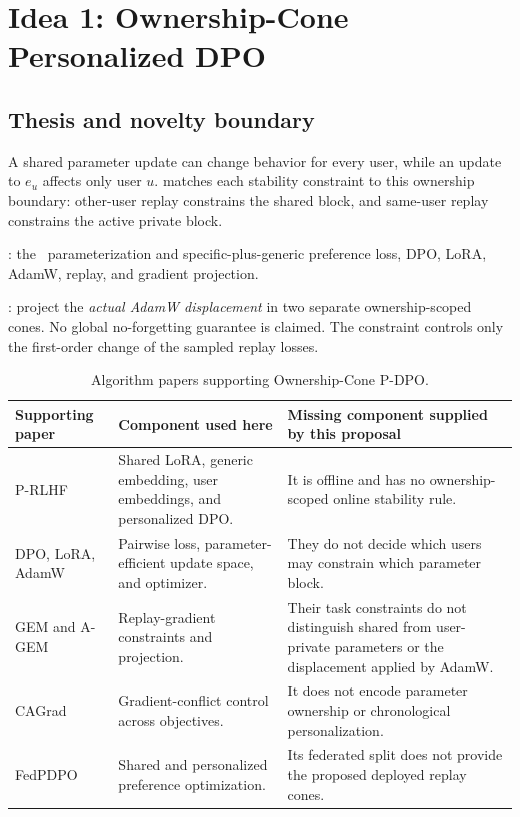 \section{Idea 1: Ownership-Cone Personalized DPO}
\label{sec:ownership-cone}

\subsection{Thesis and novelty boundary}

A shared parameter update can change behavior for every user, while an update
to $e_u$ affects only user $u$.   matches each
stability constraint to this ownership boundary: other-user replay constrains
the shared block, and same-user replay constrains the active private block.

\Inherited: the \prlhf\ parameterization and specific-plus-generic preference
loss, DPO, LoRA, AdamW, replay, and gradient projection.

\Proposed: project the \emph{actual AdamW displacement} in two separate
ownership-scoped cones.  No global no-forgetting guarantee is claimed.  The
constraint controls only the first-order change of the sampled replay losses.

\begin{table}[t]
  \centering
  \caption{Algorithm papers supporting Ownership-Cone P-DPO.}
  \label{tab:ownership-support}
  \begin{tabularx}{\textwidth}{@{}L{0.24\textwidth}Y Y@{}}
    \toprule
    Supporting paper & Component used here & Missing component supplied by this proposal \\
    \midrule
    P-RLHF \citep{li2024personalized} &
    Shared LoRA, generic embedding, user embeddings, and personalized DPO. &
    It is offline and has no ownership-scoped online stability rule. \\
    DPO, LoRA, AdamW \citep{rafailov2023dpo,hu2022lora,loshchilov2019adamw} &
    Pairwise loss, parameter-efficient update space, and optimizer. &
    They do not decide which users may constrain which parameter block. \\
    GEM and A-GEM \citep{lopezpaz2017gem,chaudhry2019agem} &
    Replay-gradient constraints and projection. &
    Their task constraints do not distinguish shared from user-private
    parameters or the displacement applied by AdamW. \\
    CAGrad \citep{liu2021cagrad} &
    Gradient-conflict control across objectives. &
    It does not encode parameter ownership or chronological personalization. \\
    FedPDPO \citep{zhu2026fedpdpo} &
    Shared and personalized preference optimization. &
    Its federated split does not provide the proposed deployed replay cones. \\
    \bottomrule
  \end{tabularx}
\end{table}

